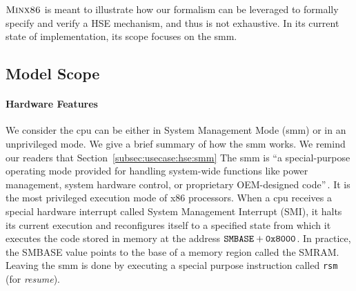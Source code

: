 $\textsc{Minx86}$ is meant to illustrate how our formalism can be leveraged
to formally specify and verify a HSE mechanism, and thus is not exhaustive.
%
In its current state of implementation, its scope focuses on the \ac{smm}.

\subsection{Model Scope}
\label{sec:speccert2:scope}

\paragraph{Hardware Features}
%
We consider the \ac{cpu} can be either in System Management Mode (\ac{smm}) or
in an unprivileged mode.
%
We give a brief summary of how the \ac{smm} works.
%
We remind our readers that Section~\ref{subsec:usecase:hse:smm}
%
The \ac{smm} is ``a special-purpose operating mode provided for handling
system-wide functions like power management, system hardware control, or
proprietary OEM-designed code''\,\cite{intel2014manual}.
%
It is the most privileged execution mode of x86 processors.
%
When a \ac{cpu} receives a special hardware interrupt called System Management
Interrupt (SMI), it halts its current execution and reconfigures itself to a
specified state from which it executes the code stored in memory at the address
$\mathtt{SMBASE} + \mathtt{0x8000}$.
%
In practice, the SMBASE value points to the base of a memory region called the
SMRAM.
%
Leaving the \ac{smm} is done by executing a special purpose instruction called
\texttt{rsm} (for \emph{resume}).

